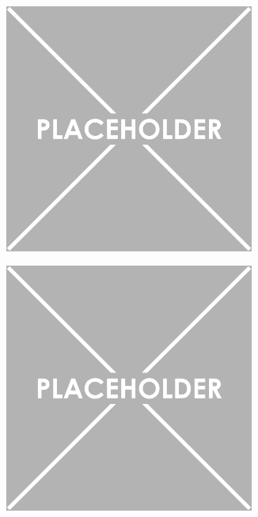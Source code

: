 \documentclass{article}
\begin{document}
		\begin{figure}[H]
			\begin{subfigure}[b]{0.5\textwidth}
				\centering
				\includegraphics[width=0.9\textwidth]{Figures/Example}
			\end{subfigure}
			\hfill
			\begin{subfigure}[b]{0.5\textwidth}
				\centering
				\includegraphics[width=0.9\textwidth]{Figures/Example}

\end{subfigure}
\end{figure}
\end{document}
